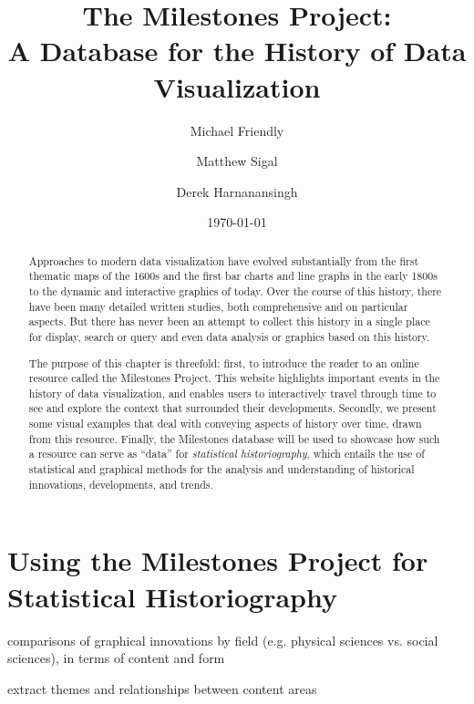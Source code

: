 \documentclass[11pt]{article}
\begin{document}
\title{The Milestones Project: \\ A Database for the History of Data Visualization}
\author{Michael Friendly \and Matthew Sigal \and Derek Harnanansingh}
\date{\today}

\maketitle

\begin{abstract}
Approaches to modern data visualization have evolved substantially from the first thematic maps of the 1600s and the
first bar charts and line graphs
in the early 1800s to the dynamic and interactive graphics of today.
Over the course of this history, there have been many detailed written studies, both comprehensive
and on particular aspects. But there has never been an attempt to collect this history 
in a single place for display, search or query and even data analysis or graphics based on this history.

The purpose of this chapter is threefold: first, to introduce the reader to an online resource called the Milestones Project. 
This website highlights important events in the history of data visualization, and enables users to interactively travel through time to see and explore
the context that surrounded their developments. Secondly, we present some visual
examples that
deal with conveying aspects of history
over time, drawn from this resource.
Finally, the Milestones database  will be used to showcase how such a resource can serve as ``data'' 
for \emph{statistical historiography}, which entails the use of statistical and graphical methods for the analysis and understanding of 
historical innovations, developments, and trends.
\end{abstract}



\section{Using the Milestones Project for Statistical Historiography}\label{sec:historiography}
\begin{itemize*}
  \item comparisons of graphical innovations by field (e.g. physical sciences vs. social sciences), in terms of content and form
  \item extract themes and relationships between content areas
\end{itemize*}
\end{document}
